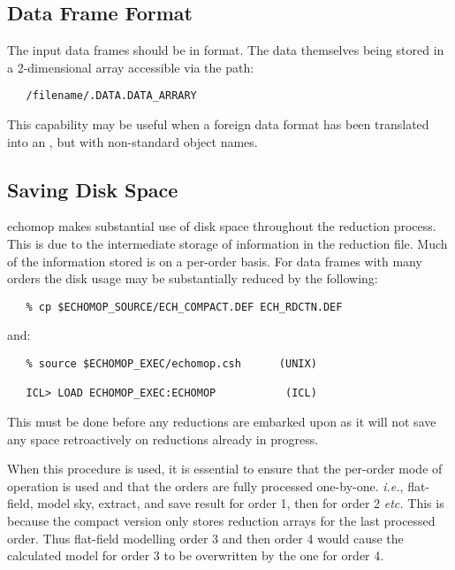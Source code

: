 \subsection{Data Frame Format}

The input data frames should be in  format.
The data themselves being stored in a 2-dimensional array accessible via
the path:

\begin{verbatim}
   /filename/.DATA.DATA_ARRARY
\end{verbatim}

This capability may be useful when a foreign data format has been
translated into an , but with non-standard object
names.


\subsection{Saving Disk Space}

{\sc echomop} makes substantial use of disk space throughout the reduction
process.  This is due to the intermediate storage of information in the
reduction file.  Much of the information stored is on a per-order basis.
For data frames with many orders the disk usage may be substantially
reduced by the following:

\begin{verbatim}
   % cp $ECHOMOP_SOURCE/ECH_COMPACT.DEF ECH_RDCTN.DEF
\end{verbatim}

and:

\begin{verbatim}
   % source $ECHOMOP_EXEC/echomop.csh      (UNIX)

   ICL> LOAD ECHOMOP_EXEC:ECHOMOP           (ICL)
\end{verbatim}

This must be done before any reductions are embarked upon as it will not
save any space retroactively on reductions  already in progress.

When this procedure is used, it is essential to ensure that the
per-order mode of operation is used and that the orders are fully
processed one-by-one. {\it{i.e.}}, flat-field, model sky, extract, and save
result for order 1,  then for order 2 {\it etc.}  This is because the compact
version only stores reduction arrays for the last processed order. Thus
flat-field modelling order 3 and then order 4 would cause the calculated
model for order 3 to be overwritten by the one for order 4.


